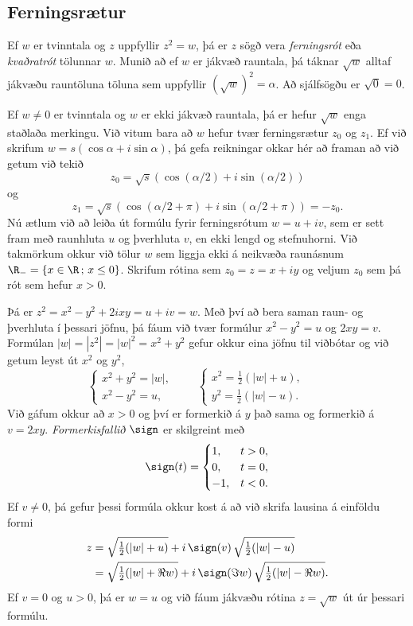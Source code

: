 \subsection*{Ferningsrætur}



Ef $w$ er tvinntala og $z$ uppfyllir $z^2=w$, þá er $z$ sögð vera
{\it ferningsrót} eða {\it kvaðratrót } tölunnar $w$.
Munið að ef $w$ er jákvæð rauntala, þá táknar $\sqrt w$ alltaf jákvæðu
rauntöluna  töluna sem uppfyllir $(\sqrt w)^2=\alpha$.  
Að sjálfsögðu er $\sqrt 0=0$.


Ef $w\neq 0$ er tvinntala og $w$ er ekki jákvæð rauntala, þá 
er hefur $\sqrt w$ enga staðlaða merkingu.  Við vitum bara að 
$w$ hefur tvær  ferningsrætur  $z_0$ og $z_1$.  Ef við skrifum 
$w=s(\cos \alpha+i\sin\alpha)$, þá gefa reikningar okkar hér að framan
að við getum við tekið
$$
z_0=\sqrt{s}(\cos(\alpha/2)+i\sin (\alpha/2))
$$
og
$$
z_1=\sqrt{s}(\cos(\alpha/2+\pi)+i\sin (\alpha/2+\pi))=-z_0.
$$  
Nú ætlum við að leiða út formúlu fyrir ferningsrótum  
$w=u+iv$, sem er sett fram með raunhluta $u$ og þverhluta $v$, en ekki
lengd og stefnuhorni.  Við takmörkum okkur við
tölur $w$ sem liggja ekki á neikvæða raunásnum $\R_-=\{x\in \R\,;\,
x\leq 0\}$.  Skrifum  rótina sem $z_0=z=x+iy$ og veljum $z_0$ sem þá
rót sem hefur $x>0$.  


Þá er $z^2=x^2-y^2+2ixy=u+iv=w$.  Með því að bera saman
raun- og þverhluta í þessari jöfnu, þá fáum við tvær
formúlur  $x^2-y^2=u$ og $2xy=v$.  Formúlan $|w|=|z^2|=|w|^2=x^2+y^2$
gefur okkur eina jöfnu til viðbótar og við getum leyst út $x^2$ og
$y^2$, 
$$
\begin{cases}
x^2+y^2=|w|,\\
x^2-y^2=u,
\end{cases}\qquad
\begin{cases}
x^2=\tfrac 12(|w|+u),\\
y^2=\tfrac 12(|w|-u).
\end{cases}\qquad
$$
Við gáfum okkur að $x>0$ og því  er formerkið á $y$ 
það sama og formerkið á $v=2xy$.   
{\it Formerkisfallið} $\sign$ er skilgreint með
$$
\sign(t)=
\begin{cases}
1, &t>0,\\
0, &t=0,\\
-1,&t<0.
\end{cases}
$$
Ef $v\neq 0$, þá  gefur þessi  formúla okkur kost á að  við 
skrifa lausina á einföldu formi
\begin{align*}
z&=\sqrt{\tfrac 12(|w|+u)}+i\, \sign(v)\, \sqrt{\tfrac 12(|w|-u)}\\
&=\sqrt{\tfrac 12(|w|+\Re w)}+i\, \sign(\Im w)\, \sqrt{\tfrac
12(|w|-\Re w)}.
\end{align*}
Ef $v=0$ og $u>0$, þá er $w=u$ og við fáum jákvæðu rótina
$z=\sqrt w$ út úr þessari formúlu.


